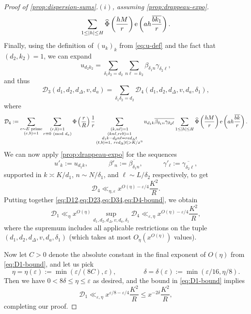 \documentclass[reqno,11pt]{amsart}
\theoremstyle{definition}
\theoremstyle{remark}
\numberwithin{equation}{section}
\newcommand{\mD}{\mathcal{D}}
\newcommand{\e}{\textnormal{e}}
\newcommand{\eps}{\varepsilon}
\renewcommand{\bar}{\overline}
\renewcommand{\hat}{\widehat}
\renewcommand{\pmod}[1]{\ (\textnormal{mod } #1)}
\begin{document}
\begin{proof}[Proof of \cref{prop:dispersion-sums}.$(i)$, assuming \cref{prop:drappeau-expo}]
\[    \sum_{1 \le |h| \le H} \hat{\Phi}\left(\frac{hM}{r}\right) \e\left(a h \frac{\bar{bk_1}}{r} \right).
\]
Finally, using the definition of $(u_k)_k$ from \cref{eq:u-def} and the fact that $(d_2, k_2) = 1$, we can expand
\[
    u_{d_2 k_2} = \sum_{\delta_1 \delta_2 = d_2} \sum_{n\ell = k_2} \beta_{\delta_1 n} \gamma_{\delta_2 \ell},
\]
and thus
\begin{equation} \label{eq:D34}
    \mD_3(d_1, d_2, d_\Delta, v, d_a) = \sum_{\delta_1 \delta_2 = d_2} \mD_4(d_1, d_2, d_\Delta, v, d_a, \delta_1),
\end{equation}
where
\[
    \mD_4 := \sum_{\substack{e \sim E \text{ prime} \\ (e, b) = 1}} \sum_{\substack{(r, b) = 1 \\ r \equiv 0 \pmod{d_a}}} \Phi\left(\frac{r}{R}\right) \frac{1}{r} 
    \sum_{\substack{(k, n\ell) = 1 \\ (k n \ell, re b) = 1 \\ d_1k - d_2n \ell = red_\Delta t \\ (t, b) = 1,\  red_\Delta |t| > K/x^\eta}} u_{d_1k} \bar{\beta_{\delta_1 n} \gamma_{\delta_2 \ell}} 
    \sum_{1 \le |h| \le H} \hat{\Phi}\left(\frac{hM}{r}\right) \e\left(a h \frac{\bar{bk}}{r} \right).
\]
We can now apply \cref{prop:drappeau-expo} for the sequences
\[
    u'_k := u_{d_1 k},
    \qquad\quad 
    \beta'_n := \bar{\beta_{\delta_1 n}},
    \qquad\quad
    \gamma'_\ell := \bar{\gamma_{\delta_2 \ell}},
\]
supported in $k \asymp K/d_1$, $n \sim N/\delta_1$, and $\ell \sim L/\delta_2$ respectively, to get
\begin{equation} \label{eq:D4-bound}
    \mD_4 \ll_{\eta,\eps} x^{O(\eta) - \eps/4} \frac{K^2}{R}.
\end{equation}
Putting together \cref{eq:D12,eq:D23,eq:D34,eq:D4-bound}, we obtain
\begin{equation} \label{eq:D1-bound}
    \mD_1 \ll_\eta x^{O(\eta)} \sup_{d_1,d_2,d_\Delta,v,d_a,\delta_1} \mD_4 \ll_{\eps, \eta} x^{O(\eta) - \eps/4} \frac{K^2}{R},
\end{equation}
where the supremum includes all applicable restrictions on the tuple $(d_1,d_2,d_\Delta,v,d_a,\delta_1)$ (which takes at most $O_\eta(x^{O(\eta)})$ values).

Now let $C > 0$ denote the absolute constant in the final exponent of $O(\eta)$ from \cref{eq:D1-bound}, and let us pick 
\[
    \eta = \eta(\eps) := \min(\eps/(8C), \eps),
    \qquad\qquad 
    \delta = \delta(\eps) := \min(\eps/16, \eta/8).
\] 
Then we have $0 < 8\delta \le \eta \le \eps$ as desired, and the bound in \cref{eq:D1-bound} implies
\[
    \mD_1 \ll_{\eps, \eta} x^{\eps/8 - \eps/4} \frac{K^2}{R}
    \le 
    x^{-2\delta} \frac{K^2}{R},
\]
completing our proof.
\end{proof}
\end{document}

